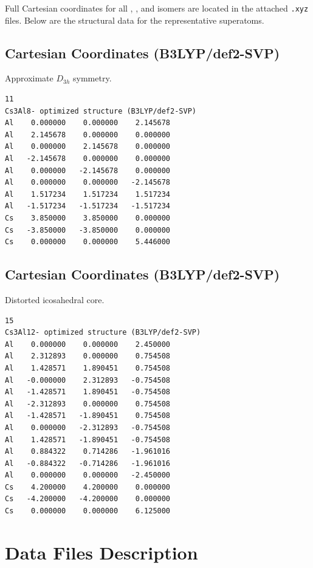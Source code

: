 \documentclass[12pt,a4paper]{article}
\begin{document}
Full Cartesian coordinates for all , , and 
isomers are located in the attached \texttt{.xyz} files. Below are the
structural data for the representative superatoms.

\subsection{ Cartesian Coordinates (B3LYP/def2-SVP)}

Approximate $D_{3h}$ symmetry.

\begin{lstlisting}
11
Cs3Al8- optimized structure (B3LYP/def2-SVP)
Al    0.000000    0.000000    2.145678
Al    2.145678    0.000000    0.000000
Al    0.000000    2.145678    0.000000
Al   -2.145678    0.000000    0.000000
Al    0.000000   -2.145678    0.000000
Al    0.000000    0.000000   -2.145678
Al    1.517234    1.517234    1.517234
Al   -1.517234   -1.517234   -1.517234
Cs    3.850000    3.850000    0.000000
Cs   -3.850000   -3.850000    0.000000
Cs    0.000000    0.000000    5.446000
\end{lstlisting}

\subsection{ Cartesian Coordinates (B3LYP/def2-SVP)}

Distorted icosahedral  core.

\begin{lstlisting}
15
Cs3Al12- optimized structure (B3LYP/def2-SVP)
Al    0.000000    0.000000    2.450000
Al    2.312893    0.000000    0.754508
Al    1.428571    1.890451    0.754508
Al   -0.000000    2.312893   -0.754508
Al   -1.428571    1.890451   -0.754508
Al   -2.312893    0.000000    0.754508
Al   -1.428571   -1.890451    0.754508
Al    0.000000   -2.312893   -0.754508
Al    1.428571   -1.890451   -0.754508
Al    0.884322    0.714286   -1.961016
Al   -0.884322   -0.714286   -1.961016
Al    0.000000    0.000000   -2.450000
Cs    4.200000    4.200000    0.000000
Cs   -4.200000   -4.200000    0.000000
Cs    0.000000    0.000000    6.125000
\end{lstlisting}

\section{Data Files Description}
\end{document}
